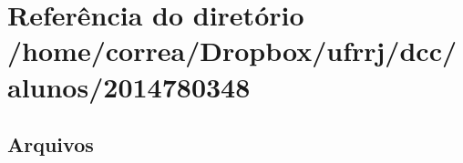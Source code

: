 \section{Referência do diretório /home/correa/\+Dropbox/ufrrj/dcc/alunos/2014780348}
\label{dir_09f36bc6326f592281461f6cde306140}
\subsection*{Arquivos}
\begin{DoxyCompactItemize}
\end{DoxyCompactItemize}
